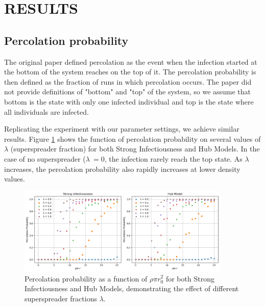 \documentclass{article}
\begin{document}
\section{RESULTS}
\subsection{Percolation probability}
The original paper defined percolation as the event when the infection started at the bottom of the system reaches on the top of it. The percolation probability is then defined as the fraction of runs in which percolation occurs. The paper did not provide definitions of "bottom" and "top" of the system, so we assume that bottom is the state with only one infected individual and top is the state where all individuals are infected. 

Replicating the experiment with our parameter settings, we achieve similar results. Figure \ref{fig:percolation_probability} shows the function of percolation probability on several values of \(\lambda\) (superspreader fraction) for both Strong Infectiousness and Hub Models. In the case of no superspreader (\(\lambda\ = 0\), the infection rarely reach the top state. As \(\lambda\) increases, the percolation probability also rapidly increases at lower density values.

\begin{figure}[!htbp]
    \centering
    \includegraphics[width=0.9\textwidth]{fig/percolation.png} %
    \caption{Percolation probability as a function of \(\rho\pi r_0^2\) for both Strong Infectiousness and Hub Models, demonstrating the effect of different superspreader fractions \(\lambda\).}
    \label{fig:percolation_probability}
\end{figure}
\end{document}
